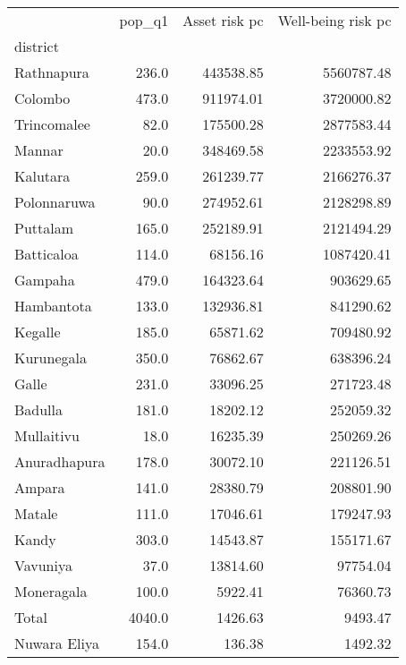 \begin{tabular}{lrrr}
\toprule
{} &  pop\_q1 &  Asset risk pc &  Well-being risk pc \\
district     &         &                &                     \\
\midrule
Rathnapura   &   236.0 &      443538.85 &          5560787.48 \\
Colombo      &   473.0 &      911974.01 &          3720000.82 \\
Trincomalee  &    82.0 &      175500.28 &          2877583.44 \\
Mannar       &    20.0 &      348469.58 &          2233553.92 \\
Kalutara     &   259.0 &      261239.77 &          2166276.37 \\
Polonnaruwa  &    90.0 &      274952.61 &          2128298.89 \\
Puttalam     &   165.0 &      252189.91 &          2121494.29 \\
Batticaloa   &   114.0 &       68156.16 &          1087420.41 \\
Gampaha      &   479.0 &      164323.64 &           903629.65 \\
Hambantota   &   133.0 &      132936.81 &           841290.62 \\
Kegalle      &   185.0 &       65871.62 &           709480.92 \\
Kurunegala   &   350.0 &       76862.67 &           638396.24 \\
Galle        &   231.0 &       33096.25 &           271723.48 \\
Badulla      &   181.0 &       18202.12 &           252059.32 \\
Mullaitivu   &    18.0 &       16235.39 &           250269.26 \\
Anuradhapura &   178.0 &       30072.10 &           221126.51 \\
Ampara       &   141.0 &       28380.79 &           208801.90 \\
Matale       &   111.0 &       17046.61 &           179247.93 \\
Kandy        &   303.0 &       14543.87 &           155171.67 \\
Vavuniya     &    37.0 &       13814.60 &            97754.04 \\
Moneragala   &   100.0 &        5922.41 &            76360.73 \\
Total        &  4040.0 &        1426.63 &             9493.47 \\
Nuwara Eliya &   154.0 &         136.38 &             1492.32 \\
\bottomrule
\end{tabular}
